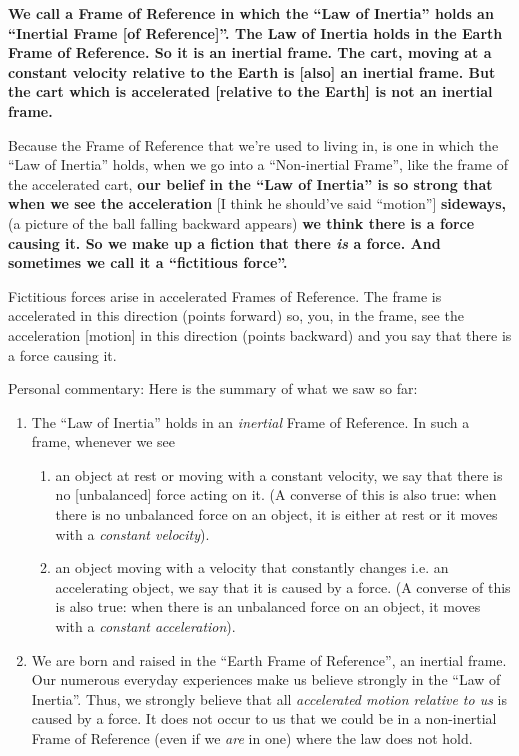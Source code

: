 \documentclass[a6paper]{article}
\begin{document}
\textbf{We call a Frame of Reference in which the ``Law of Inertia'' holds an ``Inertial Frame [of Reference]''. The Law of Inertia holds in the Earth Frame of Reference. So it is an inertial frame. The cart, moving at a constant velocity relative to the Earth is [also] an inertial frame. But the cart which is accelerated [relative to the Earth] is not an inertial frame.}

Because the Frame of Reference that we're used to living in, is one in which the ``Law of Inertia'' holds, when we go into a ``Non-inertial Frame'', like the frame of the accelerated cart, \textbf{our belief in the ``Law of Inertia'' is so strong that when we see the acceleration} [I think he should've said ``motion''] \textbf{sideways,} (a picture of the ball falling backward appears) \textbf{we think there is a force causing it. So we make up a fiction that there \emph{is} a force. And sometimes we call it a ``fictitious force''.}

Fictitious forces arise in accelerated Frames of Reference. The frame is accelerated in this direction (points forward) so, you, in the frame, see the acceleration [motion] in this direction (points backward) and you say that there is a force causing it. 

Personal commentary: Here is the summary of what we saw so far:
\begin{enumerate}
    \item The ``Law of Inertia'' holds in an \emph{inertial} Frame of Reference. In such a frame, whenever we see 
        \begin{enumerate} 
            \item an object at rest or moving with a constant velocity, we say that there is no [unbalanced] force acting on it. (A converse of this is also true: when there is no unbalanced force on an object, it is either at rest or it moves with a \emph{constant velocity}).
            \item an object moving with a velocity that constantly changes i.e. an accelerating object, we say that it is caused by a force. (A converse of this is also true: when there is an unbalanced force on an object, it moves with a \emph{constant acceleration}).
        \end{enumerate}
    \item We are born and raised in the ``Earth Frame of Reference'', an inertial frame. Our numerous everyday experiences make us believe strongly in the ``Law of Inertia''. Thus, we strongly believe that all \emph{accelerated motion relative to us} is caused by a force. It does not occur to us that we could be in a non-inertial Frame of Reference (even if we \emph{are} in one) where the law does not hold.

\end{enumerate}
\end{document}

